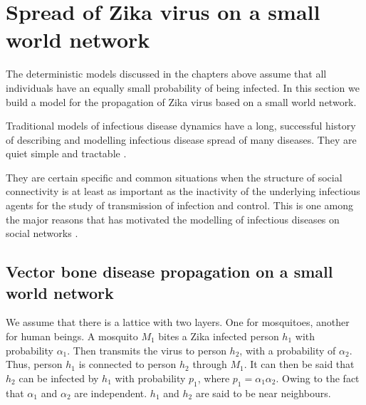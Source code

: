 \chapter{ Spread of Zika virus on a small world network }

The deterministic models discussed in the chapters above assume that all individuals have an equally small probability of being infected. In this section we build a model for the propagation of Zika virus based on a small world network.

Traditional models of infectious disease dynamics have a long, successful history of describing and modelling infectious disease spread of many diseases. They are quiet simple and tractable \citep{fu2013propagation}.

They
are certain specific and common situations when the structure of social connectivity is at least as important as the inactivity of the underlying infectious agents for the study of transmission of infection and control. This is one among the major reasons that has motivated the modelling of infectious diseases on social networks \cite{fu2013propagation}.



\section{ Vector bone disease propagation on a small world network}
We assume that there is a lattice with two layers. One for mosquitoes, another for human beings. A mosquito $M_1$ bites a Zika infected person $h_1$ with probability $\alpha_1$. Then transmits the virus to person $h_2$, with a probability of $\alpha_2$. Thus, person $h_1$ is connected to  person $h_2$ through $M_1$. It can then be said that $h_2$ can be infected by $h_1$ with probability $p_1$, where $p_1 =  \alpha_1 \alpha_2$. Owing to the fact
that $\alpha_1$ and $\alpha_2$ are  independent. $h_1$ and $h_2$ are said to be near neighbours.


